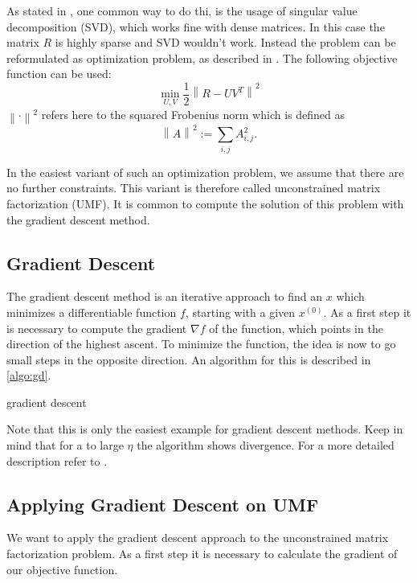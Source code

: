 \documentclass[DIV=14,twocolumn]{scrartcl}
\newcommand{\norm}[1]{\left\lVert#1\right\rVert}
\begin{document}
As stated in \cite{KoBeVo09}, one common way to do thi, is the usage of singular value decomposition (SVD), which works fine with dense matrices. In this case the matrix $R$ is highly sparse and SVD wouldn't work. Instead the problem can be reformulated as optimization problem, as described in \cite{Ag16}. The following objective function can be used: 
$$\min_{U,V} \frac{1}{2}\norm{R-UV^T}^2$$ 
$\norm{\cdot}^2$ refers here to the squared Frobenius norm which is defined as $$\norm{A}^2:=\sum_{i,j}A_{i,j}^2.$$

In the easiest variant of such an optimization problem, we assume that there are no further constraints. This variant is therefore called unconstrained matrix factorization (UMF). 
It is common to compute the solution of this problem with the gradient descent method.

\subsection{Gradient Descent}\label{gd}
The gradient descent method is an iterative approach to find an $x$ which minimizes a differentiable function $f$, starting with a given $x^{(0)}$. As a first step it is necessary to compute the gradient $\nabla f$ of the function, which points in the direction of the highest ascent. 
To minimize the function, the idea is now to go small steps in the opposite direction. An algorithm for this is described in \autoref{algo:gd}. 

\begin{algorithm}
	\caption{gradient descent}
	\label{algo:gd}

\end{algorithm}
Note that this is only the easiest example for gradient descent methods. Keep in mind that for a to large $\eta$ the algorithm shows divergence.
For a more detailed description refer to \cite{ShSh14}. 

\subsection{Applying Gradient Descent on UMF} 
We want to apply the gradient descent approach to the unconstrained matrix factorization problem. 
As a first step it is necessary to calculate the gradient of our objective function. 
\end{document}
